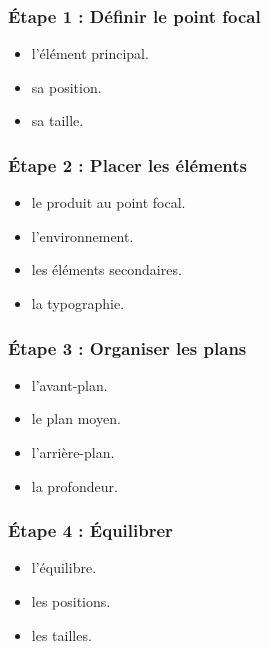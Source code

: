 \subsubsection{Étape 1 : Définir le point focal}

\begin{itemize}
    \item {} l'élément principal.
    \item {} sa position.
    \item {} sa taille.
\end{itemize}

\subsubsection{Étape 2 : Placer les éléments}

\begin{itemize}
    \item {} le produit au point focal.
    \item {} l'environnement.
    \item {} les éléments secondaires.
    \item {} la typographie.
\end{itemize}

\subsubsection{Étape 3 : Organiser les plans}

\begin{itemize}
    \item {} l'avant-plan.
    \item {} le plan moyen.
    \item {} l'arrière-plan.
    \item {} la profondeur.
\end{itemize}

\subsubsection{Étape 4 : Équilibrer}

\begin{itemize}
    \item {} l'équilibre.
    \item {} les positions.
    \item {} les tailles.
\end{itemize}

